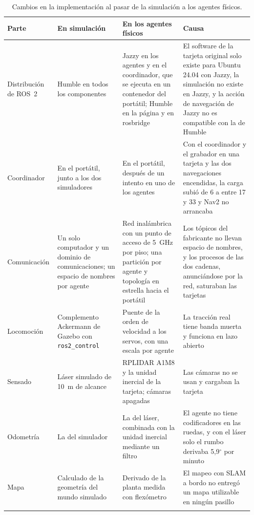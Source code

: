 \begin{table}[H]
  \centering\footnotesize
  \caption{Cambios en la implementación al pasar de la simulación a los agentes físicos.}
  \label{tab:sim-vehiculos}
  \begin{tabular}{@{}p{}p{}p{}p{}@{}}
    \toprule
    \textbf{Parte} & \textbf{En simulación} & \textbf{En los agentes físicos} & \textbf{Causa} \\ \midrule
    Distribución de ROS~2 & Humble en todos los componentes & Jazzy en los agentes y en el coordinador, que se ejecuta en un contenedor del portátil; Humble en la página y en rosbridge & El software de la tarjeta original solo existe para Ubuntu 24.04 con Jazzy, la simulación no existe en Jazzy, y la acción de navegación de Jazzy no es compatible con la de Humble \\ \addlinespace
    Coordinador & En el portátil, junto a los dos simuladores & En el portátil, después de un intento en uno de los agentes & Con el coordinador y el grabador en una tarjeta y las dos navegaciones encendidas, la carga subió de 6 a entre 17 y 33 y Nav2 no arrancaba \\ \addlinespace
    Comunicación & Un solo computador y un dominio de comunicaciones; un espacio de nombres por agente & Red inalámbrica con un punto de acceso de 5~GHz por piso; una partición por agente y topología en estrella hacia el portátil & Los tópicos del fabricante no llevan espacio de nombres, y los procesos de las dos cadenas, anunciándose por la red, saturaban las tarjetas \\ \addlinespace
    Locomoción & Complemento Ackermann de Gazebo con \texttt{ros2\_control} & Puente de la orden de velocidad a los servos, con una escala por agente & La tracción real tiene banda muerta y funciona en lazo abierto \\ \addlinespace
    Sensado & Láser simulado de 10~m de alcance & RPLIDAR A1M8 y la unidad inercial de la tarjeta; cámaras apagadas & Las cámaras no se usan y cargaban la tarjeta \\ \addlinespace
    Odometría & La del simulador & La del láser, combinada con la unidad inercial mediante un filtro & El agente no tiene codificadores en las ruedas, y con el láser solo el rumbo derivaba 5,9$^\circ$ por minuto \\ \addlinespace
    Mapa & Calculado de la geometría del mundo simulado & Derivado de la planta medida con flexómetro & El mapeo con SLAM a bordo no entregó un mapa utilizable en ningún pasillo \\ \addlinespace

\end{tabular}
\end{table}
